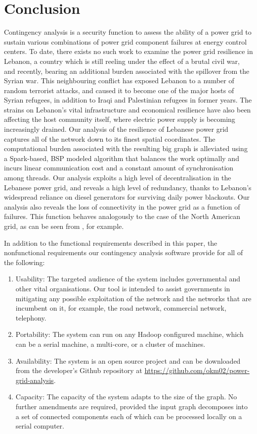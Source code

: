 \section{Conclusion}
\label{conclusion}
Contingency analysis is a security function to assess the ability of a power grid to sustain various combinations of power grid component failures at energy control centers. To date, there exists no such work to examine the power grid resilience in Lebanon, a country which is still reeling under the effect of a brutal civil war, and recently, bearing an additional burden associated with the spillover from the Syrian war. This neighbouring conflict has exposed Lebanon to a number of random terrorist attacks, and caused it to become one of the major hosts of Syrian refugees, in addition to Iraqi and Palestinian refugees in former years. The strains on Lebanon's vital infrastructure and economical resilience have also been affecting the host community itself, where electric power supply is becoming increasingly drained. Our analysis of the resilience of Lebanese power grid captures all of the network down to its finest spatial coordinates. The computational burden associated with the resulting big graph is alleviated using a Spark-based, BSP modeled algorithm that balances the work optimally and incurs linear communication cost and a constant amount of synchronisation among threads. Our analysis exploits a high level of decentralisation in the Lebanese power grid, and reveals a high level of redundancy, thanks to Lebanon's widespread reliance on diesel generators for surviving daily power blackouts. Our analysis also reveals the loss of connectivity in the power grid as a function of failures. This function behaves analogously to the case of the North American grid, as can be seen from \cite{2000Natur.406..378A}, for example. 

In addition to the functional requirements described in this paper, the nonfunctional requirements our contingency analysis software provide for all of the following:
\begin{enumerate}
\item Usability: The targeted audience of the system includes governmental and other vital organisations. Our tool is intended to assist governments in mitigating any possible exploitation of the network and the networks that are incumbent on it, for example, the road network, commercial network, telephony.
\item Portability: The system can run on any Hadoop configured machine, which can be a serial machine, a multi-core, or a cluster of machines.
\item Availability: The system is an open source project and can be downloaded from the developer's Github repository at \url{https://github.com/okm02/power-grid-analysis}.
\item Capacity: The capacity of the system adapts to the size of the graph. No further amendments are required, provided the input graph decomposes into a set of connected components each of which can be processed locally on a serial computer. 
\end{enumerate}
